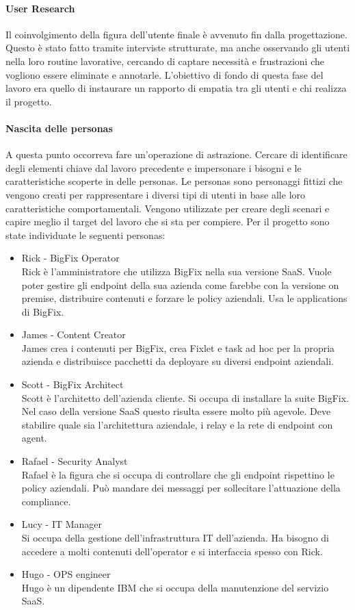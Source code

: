 \paragraph{User Research}
Il coinvolgimento della figura dell'utente finale è avvenuto fin dalla progettazione. Questo è stato fatto tramite interviste strutturate, ma anche osservando gli utenti nella loro routine lavorative, cercando di captare necessità e frustrazioni che vogliono essere eliminate e annotarle. L'obiettivo di fondo di questa fase del lavoro era quello di instaurare un rapporto di empatia tra gli utenti e chi realizza il progetto.

\paragraph{Nascita delle personas}
A questa punto occorreva fare un'operazione di astrazione. Cercare di identificare degli elementi chiave dal lavoro precedente e impersonare i bisogni e le caratteristiche scoperte in delle personas. Le personas sono personaggi fittizi che vengono creati per rappresentare i diversi tipi di utenti in base alle loro caratteristiche comportamentali. Vengono utilizzate per creare degli scenari e capire meglio il target del lavoro che si sta per compiere. Per il progetto sono state individuate le seguenti personas:
\begin{itemize}
	\item Rick - BigFix Operator \\
	Rick è l'amministratore che utilizza BigFix nella sua versione SaaS. Vuole poter gestire gli endpoint della sua azienda come farebbe con la versione on premise, distribuire contenuti e forzare le policy aziendali. Usa le applications di BigFix.
	\item James - Content Creator \\
	James crea i contenuti per BigFix, crea Fixlet e task ad hoc per la propria azienda e distribuisce pacchetti da deployare su diversi endpoint aziendali.
	\item Scott - BigFix Architect \\
	Scott è l'architetto dell'azienda cliente. Si occupa di installare la suite BigFix. Nel caso della versione SaaS questo risulta essere molto più agevole. Deve stabilire quale sia l'architettura aziendale, i relay e la rete di endpoint con agent.
	\item  Rafael - Security Analyst \\
	Rafael è la figura che si occupa di controllare che gli endpoint rispettino le policy aziendali. Può mandare dei messaggi per sollecitare l'attuazione della compliance.
	\item Lucy - IT Manager \\
	Si occupa della gestione dell'infrastruttura IT dell'azienda. Ha bisogno di accedere a molti contenuti dell'operator e si interfaccia spesso con Rick.
	\item Hugo - OPS engineer \\
	Hugo è un dipendente IBM che si occupa della manutenzione del servizio SaaS.
\end{itemize}

